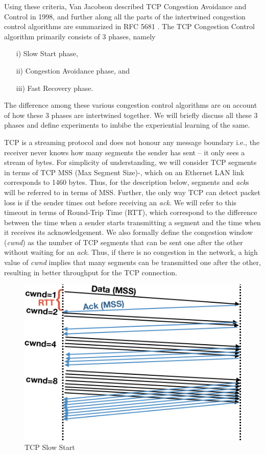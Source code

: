 \begin{multicols}{2}
Using these criteria, Van Jacobson described TCP Congestion Avoidance and Control \cite{art2-key04} in 1998, and further along all the parts of the intertwined congestion control algorithms are summarized in RFC 5681  \cite{art2-key05}.  The TCP Congestion Control algorithm primarily consists of 3 phases, namely
\begin{itemize}
\item[i)] Slow Start phase,

\item[ii)] Congestion Avoidance phase, and

\item[iii)] Fast Recovery phase. 
\end{itemize}

The difference among these various congestion control algorithms are on account of how these 3 phases are intertwined together. We will briefly discuss all these 3 phases and define experiments to imbibe the experiential learning of the same.

TCP is a streaming protocol \cite{art2-key13} and does not honour any message boundary i.e., the receiver never knows how many segments the sender has sent – it only sees a stream of bytes. For simplicity of understanding, we will consider TCP segments in terms of TCP MSS (Max Segment Size)-\cite{art2-key06}\cite{art2-key07}, which on an Ethernet LAN link corresponds to 1460 bytes. Thus, for the description below, segments and \textit{ack}s will be referred to in terms of MSS. Further, the only way TCP can detect packet loss is if the sender times out before receiving an \textit{ack}. We will refer to this timeout in terms of Round-Trip Time (RTT), which correspond to the difference between the time when a sender starts transmitting a segment and the time when it receives its acknowledgement. We also formally define the congestion window (\textit{cwnd}) as the number of TCP segments that can be sent one after the other without waiting for an \textit{ack}. Thus, if there is no congestion in the network, a high value of \textit{cwnd} implies that many segments can be transmitted one after the other, resulting in better throughput for the TCP connection.
\setcounter{figure}{0}
\begin{figure}[H]
\centering
\includegraphics[scale=2]{src/Figures/chap2/chap2-fig01.jpg}
\caption{TCP Slow Start}\label{chap2-fig01}
\end{figure}


\end{multicols}
